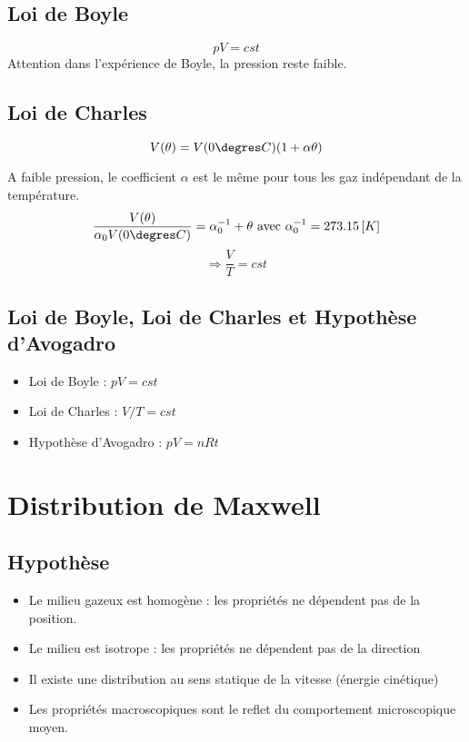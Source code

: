 \documentclass[12pt,a4paper,twoside]{report}
\begin{document}
\subsection{Loi de Boyle}
$$pV=cst$$ 
Attention dans l'expérience de Boyle, la pression reste faible.
\subsection{Loi de Charles}
$$V(\theta)=V(0 \degres C)(1+\alpha \theta)$$

A faible pression, le coefficient $\alpha$ est le même pour tous les gaz indépendant de la température.
$$\frac{V(\theta)}{\alpha_0V(0\degres C)}=\alpha^{-1}_0 +\theta\textmd{ avec }\alpha_0^{-1}=273.15 \left[K\right]$$
$$\Rightarrow \frac{V}{T}=cst$$
\subsection{Loi de Boyle, Loi de Charles et Hypothèse d'Avogadro}
\begin{itemize}
\item Loi de Boyle : $pV=cst$
\item Loi de Charles : $V/T=cst$
\item Hypothèse d'Avogadro : $pV=nRt$
\end{itemize}
\section{Distribution de Maxwell}
\subsection{Hypothèse}
\begin{itemize}
\item Le milieu gazeux est homogène : les propriétés ne dépendent pas de la position.
\item Le milieu est isotrope : les propriétés ne dépendent pas de la direction
\item Il existe une distribution au sens statique de la vitesse (énergie cinétique)
\item Les propriétés macroscopiques sont le reflet du comportement microscopique moyen.
\end{itemize}
\end{document}
